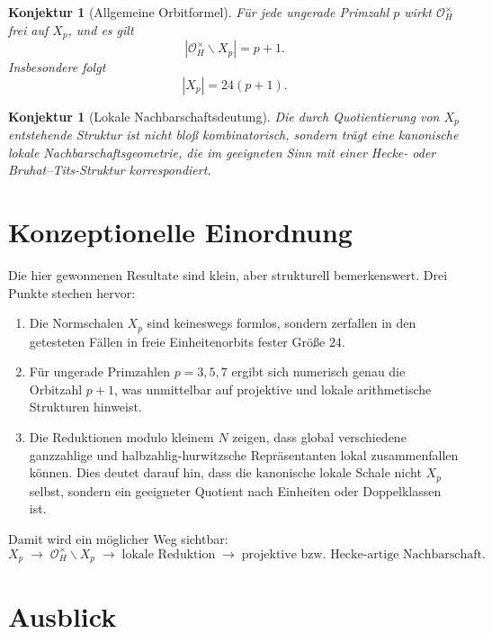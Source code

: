 \documentclass[12pt,a4paper]{article}
\theoremstyle{plain}
\newtheorem{konjektur}[satz]{Konjektur}
\theoremstyle{definition}
\theoremstyle{remark}
\newcommand{\OH}{\mathcal O_H}
\begin{document}
	\begin{konjektur}[Allgemeine Orbitformel]
		Für jede ungerade Primzahl \(p\) wirkt \(\OH^\times\) frei auf \(X_p\), und es gilt
		\[
		|\OH^\times\backslash X_p|=p+1.
		\]
		Insbesondere folgt
		\[
		|X_p|=24(p+1).
		\]
	\end{konjektur}
	
	\begin{konjektur}[Lokale Nachbarschaftsdeutung]
		Die durch Quotientierung von \(X_p\) entstehende Struktur ist nicht bloß kombinatorisch,
		sondern trägt eine kanonische lokale Nachbarschaftsgeometrie, die im geeigneten Sinn mit
		einer Hecke- oder Bruhat--Tits-Struktur korrespondiert.
	\end{konjektur}
	
	\section{Konzeptionelle Einordnung}
	
	Die hier gewonnenen Resultate sind klein, aber strukturell bemerkenswert. Drei Punkte stechen hervor:
	
	\begin{enumerate}
		\item Die Normschalen \(X_p\) sind keineswegs formlos, sondern zerfallen in den getesteten
		Fällen in freie Einheitenorbits fester Größe \(24\).
		
		\item Für ungerade Primzahlen \(p=3,5,7\) ergibt sich numerisch genau die Orbitzahl \(p+1\),
		was unmittelbar auf projektive und lokale arithmetische Strukturen hinweist.
		
		\item Die Reduktionen modulo kleinem \(N\) zeigen, dass global verschiedene ganzzahlige und
		halbzahlig-hurwitzsche Repräsentanten lokal zusammenfallen können. Dies deutet darauf hin,
		dass die kanonische lokale Schale nicht \(X_p\) selbst, sondern ein geeigneter Quotient
		nach Einheiten oder Doppelklassen ist.
	\end{enumerate}
	
	Damit wird ein möglicher Weg sichtbar:
	\[
	X_p
	\;\longrightarrow\;
	\OH^\times\backslash X_p
	\;\longrightarrow\;
	\text{lokale Reduktion}
	\;\longrightarrow\;
	\text{projektive bzw. Hecke-artige Nachbarschaft}.
	\]
	
	\section{Ausblick}
	
\end{document}
